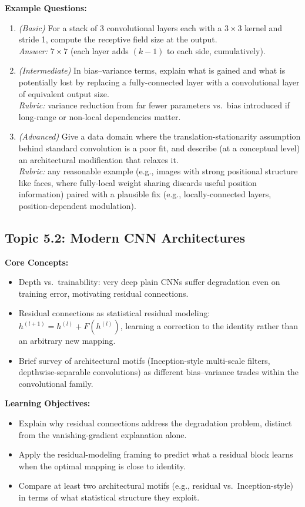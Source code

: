 \documentclass[11pt]{article}
\begin{document}
\textbf{Example Questions:}
\begin{enumerate}
  \item \textit{(Basic)} For a stack of 3 convolutional layers each with a $3\times 3$ kernel and stride 1, compute the receptive field size at the output. \\
  \textit{Answer:} $7\times 7$ (each layer adds $(k-1)$ to each side, cumulatively).
  \item \textit{(Intermediate)} In bias--variance terms, explain what is gained and what is potentially lost by replacing a fully-connected layer with a convolutional layer of equivalent output size. \\
  \textit{Rubric:} variance reduction from far fewer parameters vs.\ bias introduced if long-range or non-local dependencies matter.
  \item \textit{(Advanced)} Give a data domain where the translation-stationarity assumption behind standard convolution is a poor fit, and describe (at a conceptual level) an architectural modification that relaxes it. \\
  \textit{Rubric:} any reasonable example (e.g., images with strong positional structure like faces, where fully-local weight sharing discards useful position information) paired with a plausible fix (e.g., locally-connected layers, position-dependent modulation).
\end{enumerate}

\subsection{Topic 5.2: Modern CNN Architectures}

\textbf{Core Concepts:}
\begin{itemize}
  \item Depth vs.\ trainability: very deep plain CNNs suffer degradation even on training error, motivating residual connections.
  \item Residual connections as statistical residual modeling: $h^{(l+1)} = h^{(l)} + F(h^{(l)})$, learning a correction to the identity rather than an arbitrary new mapping.
  \item Brief survey of architectural motifs (Inception-style multi-scale filters, depthwise-separable convolutions) as different bias--variance trades within the convolutional family.
\end{itemize}

\textbf{Learning Objectives:}
\begin{itemize}
  \item Explain why residual connections address the degradation problem, distinct from the vanishing-gradient explanation alone.
  \item Apply the residual-modeling framing to predict what a residual block learns when the optimal mapping is close to identity.
  \item Compare at least two architectural motifs (e.g., residual vs.\ Inception-style) in terms of what statistical structure they exploit.
\end{itemize}
\end{document}
